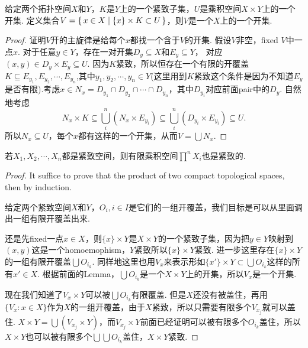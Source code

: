 \begin{lemma}
给定两个拓扑空间$X$和$Y$，$K$是$Y$上的一个紧致子集，$U$是乘积空间$X \times Y$上的一个开集. 定义集合$V = \{\,x \in X\mid\{x\} \times K \subset U\,\}$，则$V$是一个$X$上的一个开集.
\end{lemma}
\begin{proof}
证明$V$开的主旋律是给每个$x$都找一个含于$V$的开集. 假设$V$非空，fixed $V$中一点$x$. 对于任意$y \in Y$，存在一对开集$D_y \subseteq  X$和$E_y \subseteq Y$， 对应$(x,y) \in D_y \times E_y \subseteq U$. 因为$K$紧致，所以恒存在一个有限的开覆盖$K \subseteq E_{y_1},E_{y_2},\cdots,E_{y_n}$,其中$y_1,y_2,\cdots,y_n \in Y$(这里用到$K$紧致这个条件是因为不知道$E_y$是否有限).考虑$x \in N_x = D_{y_1} \cap D_{y_2} \cap \cdots \cap D_{y_n}$，其中$D_{y_i}$对应前面pair中的$D_y$. 自然地考虑\[N_x \times K \subseteq \bigcup\limits_{i}^{n}\left( N_x \times E_{y_i} \right) \subseteq \bigcup\limits_{i}^{n}\left( D_{y_i} \times E_{y_i} \right) \subseteq U.\]所以$N_x \subseteq U$，每个$x$都有这样的一个开集，从而$V = \bigcup N_x$.
\end{proof} 

\begin{theorem}
若$X_1,X_2,\cdots,X_n$都是紧致空间，则有限乘积空间$\prod\limits^{n} X_i$也是紧致的.
\end{theorem}

\begin{proof}
It suffice to prove that the product of two compact topological spaces, then by induction.

给定两个紧致空间$X$和$Y$，$O_i,i \in I$是它们的一组开覆盖，我们目标是可以从里面调出一组有限开覆盖出来.

还是先fixed一点$x \in X$，则$\{x\} \times Y$是$X \times Y$的一个紧致子集，因为把$y \in Y$映射到$(x,y)$这是一个homoemophism，$Y$紧致所以$\{x\} \times Y$紧致. 进一步这里存在$\{x\} \times Y$的一组有限开覆盖$\bigcup O_{i_k}$. 同样地这里也用$V_x$来表示形如$\{x'\} \times Y \subset \bigcup O_{i_k}$这样的所有$x' \in X$. 根据前面的Lemma，$\bigcup O_{i_k}$是一个$X \times Y$上的开集，所以$V_x$是一个开集. 

现在我们知道了$V_x \times Y$可以被$\bigcup O_{i_k}$有限覆盖. 但是$X$还没有被盖住，再用$\{V_x \colon x \in X\}$作为$X$的一组开覆盖，由于$X$紧致，所以只需要有限多个$V_{x_j}$就可以盖住. $X \times Y = \bigcup \left( V_{x_j} \times Y \right)$，而$V_{x_j} \times Y$前面已经证明可以被有限多个$O_{i_k}$盖住，所以$X \times Y$也可以被有限多个$\bigcup\bigcup O_{i_k}$盖住，$X \times Y$紧致.
\end{proof}



